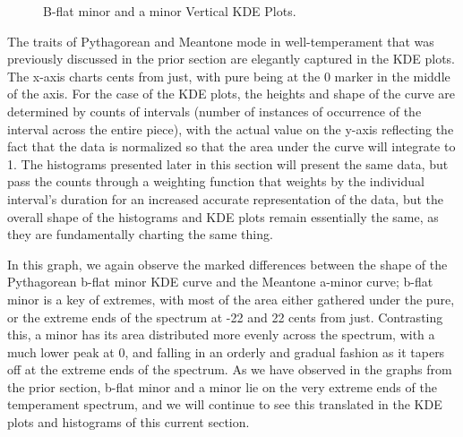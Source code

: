 \begin{figure}[H]
\vspace{1.5em}
    \centering
    \caption{B-flat minor and a minor Vertical KDE Plots.}
\end{figure}    The traits of Pythagorean and Meantone mode in well-temperament that was
previously discussed in the prior section are elegantly captured in the
KDE plots. The x-axis charts cents from just, with pure being at the 0
marker in the middle of the axis. For the case of the KDE plots, the
heights and shape of the curve are determined by counts of intervals
(number of instances of occurrence of the interval across the entire
piece), with the actual value on the y-axis reflecting the fact that the
data is normalized so that the area under the curve will integrate to 1.
The histograms presented later in this section will present the same
data, but pass the counts through a weighting function that weights by
the individual interval's duration for an increased accurate
representation of the data, but the overall shape of the histograms and
KDE plots remain essentially the same, as they are fundamentally
charting the same thing.

In this graph, we again observe the marked differences between the shape
of the Pythagorean b-flat minor KDE curve and the Meantone a-minor
curve; b-flat minor is a key of extremes, with most of the area either
gathered under the pure, or the extreme ends of the spectrum at -22 and
22 cents from just. Contrasting this, a minor has its area distributed
more evenly across the spectrum, with a much lower peak at 0, and
falling in an orderly and gradual fashion as it tapers off at the
extreme ends of the spectrum. As we have observed in the graphs from the
prior section, b-flat minor and a minor lie on the very extreme ends of
the temperament spectrum, and we will continue to see this translated in
the KDE plots and histograms of this current section.

